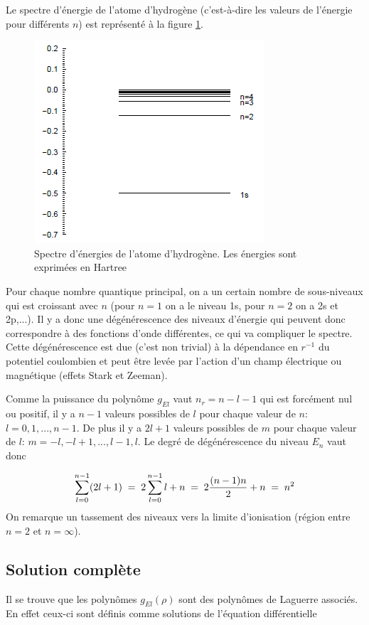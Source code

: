 Le spectre d'énergie de l'atome d'hydrogène (c'est-à-dire les valeurs de l'énergie pour différents $n$) est représenté à la figure \ref{fig:spectreH}.
\begin{figure}[htp]
    \centering
    \includegraphics{Images2/spectreH.PNG}
    \caption{Spectre d'énergies de l'atome d'hydrogène. Les énergies sont exprimées en Hartree}
    \label{fig:spectreH}
\end{figure}
Pour chaque nombre quantique principal, on a un certain nombre de sous-niveaux qui est croissant avec $n$ (pour $n=1$ on a le niveau 1s, pour $n=2$ on a 2s et 2p,...). Il y a donc une dégénérescence des niveaux d'énergie qui peuvent donc correspondre à des fonctions d'onde différentes, ce qui va compliquer le spectre. Cette dégénérescence est due (c'est non trivial) à la dépendance en $r^{-1}$ du potentiel coulombien et peut être levée par l'action d'un champ électrique ou magnétique (effets Stark et Zeeman).

Comme la puissance du polynôme $g_{El}$ vaut $n_r=n-l-1$ qui est forcément nul ou positif, il y a $n-1$ valeurs possibles de $l$ pour chaque valeur de $n$: $l=0, 1, ..., n-1$. De plus il y a $2l+1$ valeurs possibles de $m$ pour chaque valeur de $l$: $m=-l, -l+1, ..., l-1, l$. Le degré de dégénérescence du niveau $E_n$ vaut donc

\[
    \sum_{l=0}^{n-1} (2l+1)\; = \; 2\sum_{l=0}^{n-1} l + n \; = \;  2 \dfrac{(n-1)n}{2} + n \; = \;  n^2
\]
On remarque un tassement des niveaux vers la limite d'ionisation (région entre $n=2$ et $n=\infty$).

\subsection{Solution complète}
Il se trouve que les polynômes $g_{El}(\rho)$ sont des polynômes de Laguerre associés. En effet ceux-ci sont définis comme solutions de l'équation différentielle

